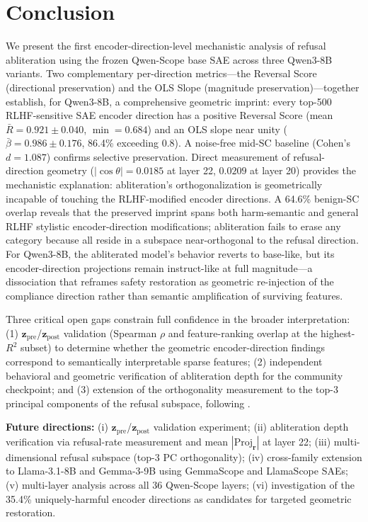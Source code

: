 \documentclass[11pt,letterpaper]{article}
\begin{document}
\section{Conclusion}

We present the first encoder-direction-level mechanistic analysis of refusal abliteration using the
frozen Qwen-Scope base SAE across three Qwen3-8B variants. Two complementary per-direction
metrics---the Reversal Score (directional preservation) and the OLS Slope (magnitude preservation)---together
establish, for Qwen3-8B, a comprehensive geometric imprint: every top-500 RLHF-sensitive SAE encoder
direction has a positive Reversal Score (mean $\bar{R} = 0.921 \pm 0.040$, $\min = 0.684$) and an
OLS slope near unity ($\bar{\beta} = 0.986 \pm 0.176$, 86.4\% exceeding 0.8). A noise-free mid-SC
baseline (Cohen's $d = 1.087$) confirms selective preservation. Direct measurement of
refusal-direction geometry ($|\cos\theta| = 0.0185$ at layer 22, $0.0209$ at layer 20) provides the
mechanistic explanation: abliteration's orthogonalization is geometrically incapable of touching the
RLHF-modified encoder directions. A 64.6\% benign-SC overlap reveals that the preserved imprint
spans both harm-semantic and general RLHF stylistic encoder-direction modifications; abliteration
fails to erase any category because all reside in a subspace near-orthogonal to the refusal direction.
For Qwen3-8B, the abliterated model's behavior reverts to base-like, but its encoder-direction
projections remain instruct-like at full magnitude---a dissociation that reframes safety restoration
as geometric re-injection of the compliance direction rather than semantic amplification of surviving
features.

Three critical open gaps constrain full confidence in the broader interpretation: (1)
$\mathbf{z}_{\text{pre}}$/$\mathbf{z}_{\text{post}}$ validation (Spearman $\rho$ and feature-ranking
overlap at the highest-$R^2$ subset) to determine whether the geometric encoder-direction findings
correspond to semantically interpretable sparse features; (2) independent behavioral and geometric
verification of abliteration depth for the community checkpoint; and (3) extension of the
orthogonality measurement to the top-3 principal components of the refusal subspace, following
\citet{Joad2026}.

\noindent\textbf{Future directions:}
(i) $\mathbf{z}_{\text{pre}}$/$\mathbf{z}_{\text{post}}$ validation experiment;
(ii) abliteration depth verification via refusal-rate measurement and mean
$|\text{Proj}_{\mathbf{r}}|$ at layer 22;
(iii) multi-dimensional refusal subspace (top-3 PC orthogonality);
(iv) cross-family extension to Llama-3.1-8B and Gemma-3-9B using GemmaScope and LlamaScope SAEs;
(v) multi-layer analysis across all 36 Qwen-Scope layers;
(vi) investigation of the 35.4\% uniquely-harmful encoder directions as candidates for targeted
geometric restoration.



\end{document}
